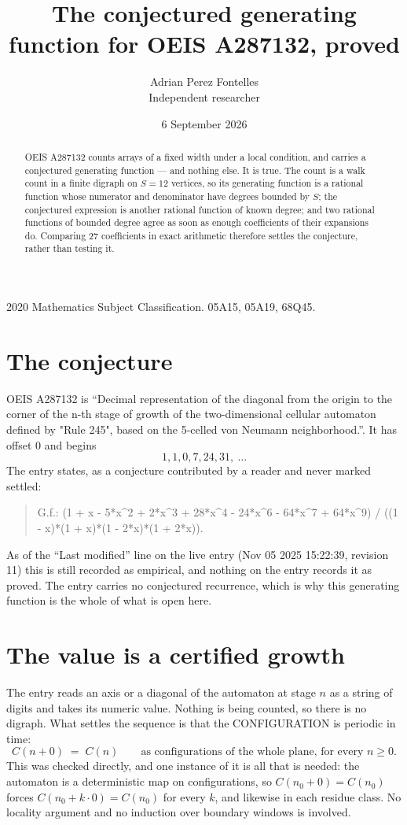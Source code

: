 \documentclass[11pt,a4paper]{article}
\title{The conjectured generating function for OEIS A287132, proved}
\author{Adrian Perez Fontelles\\ \small Independent researcher}
\date{6 September 2026}
\theoremstyle{plain}
\theoremstyle{definition}
\begin{document}
\maketitle

\begin{abstract}
OEIS A287132 counts arrays of a fixed width under a local condition, and carries a conjectured
generating function --- and nothing else. It is true. The count is a walk count in a finite
digraph on $S=12$ vertices, so its generating function is a rational function whose numerator
and denominator have degrees bounded by $S$; the conjectured expression is another rational
function of known degree; and two rational functions of bounded degree agree as soon as enough
coefficients of their expansions do. Comparing $27$ coefficients in exact arithmetic
therefore settles the conjecture, rather than testing it.
\end{abstract}

\noindent\small 2020 Mathematics Subject Classification. 05A15, 05A19, 68Q45.\normalsize

\section{The conjecture}

OEIS A287132 is ``Decimal representation of the diagonal from the origin to the corner of the n-th stage of growth of the two-dimensional cellular automaton defined by "Rule 245", based on the 5-celled von Neumann neighborhood.''. It has offset $0$ and begins
\[
1, 1, 0, 7, 24, 31,\ \dots
\]
The entry states, as a conjecture contributed by a reader and never marked settled:
\begin{quote}
G.f.: (1 + x - 5*x\^{}2 + 2*x\^{}3 + 28*x\^{}4 - 24*x\^{}6 - 64*x\^{}7 + 64*x\^{}9) / ((1 - x)*(1 + x)*(1 - 2*x)*(1 + 2*x)).
\end{quote}
As of the ``Last modified'' line on the live entry (Nov 05 2025 15:22:39, revision 11) this is still
recorded as empirical, and nothing on the entry records it as proved. The entry carries no
conjectured recurrence, which is why this generating function is the whole of what is open
here.


\section{The value is a certified growth}

The entry reads an axis or a diagonal of the automaton at stage $n$ as a string of digits and
takes its numeric value. Nothing is being counted, so there is no digraph. What settles the
sequence is that the CONFIGURATION is periodic in time:
\[
C(n+0)\;=\;C(n)\qquad\text{as configurations of the whole plane, for every } n\ge 0.
\]
This was checked directly, and one instance of it is all that is needed: the automaton is a
deterministic map on configurations, so $C(n_0+0)=C(n_0)$ forces $C(n_0+k\cdot0)=C(n_0)$ for
every $k$, and likewise in each residue class. No locality argument and no induction over
boundary windows is involved.
\end{document}
